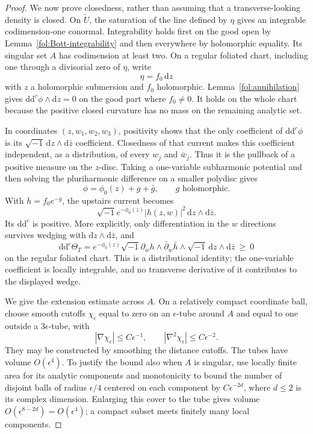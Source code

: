 \documentclass[11pt,letterpaper]{article}
\theoremstyle{definition}
\theoremstyle{remark}
\begin{document}
\begin{proof}
We now prove closedness, rather than assuming that a transverse-looking
density is closed.  On $\widetilde U$, the saturation of the line defined
by $\eta$ gives an integrable codimension-one conormal.  Integrability
holds first on the good open by Lemma~\ref{fol:Bott-integrability} and
then everywhere by holomorphic equality.  Its singular set $A$ has
codimension at least two.  On a regular foliated chart, including one
through a divisorial zero of $\eta$, write
\begin{equation}\label{fol:local-foliation}
 \eta=f_0\,\mathrm{d} z
\end{equation}
with $z$ a holomorphic submersion and $f_0$ holomorphic.
Lemma~\ref{fol:annihilation} gives
$\mathrm{d}\mathrm{d}^{c}\phi\wedge\mathrm{d} z=0$ on the good part where $f_0\ne0$.
It holds on the whole chart because the positive closed curvature
has no mass on the remaining analytic set.

In coordinates $(z,w_1,w_2,w_3)$, positivity shows that the only
coefficient of $\mathrm{d}\mathrm{d}^{c}\phi$ is its
$\sqrt{-1}\,\mathrm{d} z\wedge\mathrm{d}\bar z$ coefficient.  Closedness of that current
makes this coefficient independent, as a distribution, of every $w_j$
and $\bar w_j$.  Thus it is the pullback of a positive measure on the
$z$-disc.  Taking a one-variable subharmonic potential and then solving
the pluriharmonic difference on a smaller polydisc gives
\begin{equation}\label{fol:split-weight}
 \phi=\phi_0(z)+g+\bar g,\qquad g\text{ holomorphic}.
\end{equation}
With $h=f_0e^{-g}$, the upstairs current becomes
\[
 \sqrt{-1} e^{-\phi_0(z)}|h(z,w)|^2\,\mathrm{d} z\wedge\mathrm{d}\bar z.
\]
Its $\mathrm{d}\mathrm{d}^{c}$ is positive.  More explicitly, only differentiation in the
$w$ directions survives wedging with
$\mathrm{d} z\wedge\mathrm{d}\bar z$, and
\begin{equation}\label{fol:leaf-Hessian}
 \mathrm{d}\mathrm{d}^{c}\Theta_T
 =
 e^{-\phi_0(z)}
 \sqrt{-1}\partial_w h\wedge\bar\partial_w\bar h
 \wedge\sqrt{-1}\,\mathrm{d} z\wedge\mathrm{d}\bar z
 \ \geq\ 0
\end{equation}
on the regular foliated chart.  This is a distributional identity;
the one-variable coefficient is locally integrable, and no transverse
derivative of it contributes to the displayed wedge.

We give the extension estimate across $A$.  On a relatively compact
coordinate ball, choose smooth cutoffs $\chi_\epsilon$ equal to zero
on an $\epsilon$-tube around $A$ and equal to one outside a
$3\epsilon$-tube, with
\[
 |\nabla\chi_\epsilon|\leq C\epsilon^{-1},
 \qquad
 |\nabla^2\chi_\epsilon|\leq C\epsilon^{-2}.
\]
They may be constructed by smoothing the distance cutoffs.  The tubes
have volume $O(\epsilon^4)$.  To justify the bound also when $A$ is
singular, use locally finite area for its analytic components and
monotonicity to bound the number of disjoint balls of radius
$\epsilon/4$ centered on each component by
$C\epsilon^{-2d}$, where $d\leq2$ is its complex dimension.
Enlarging this cover to the tube gives volume
$O(\epsilon^{8-2d})=O(\epsilon^4)$; a compact subset meets finitely
many local components.


\end{proof}
\end{document}
